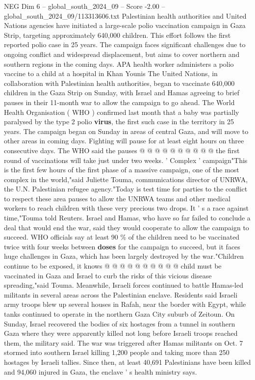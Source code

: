 \begin{textsample}{NEG Dim 6 – global\_south\_2024\_09 – Score -2.00 – global\_south\_2024\_09/113313606.txt}  \label{ex:f6_neg_008}
Palestinian health authorities and United Nations agencies have initiated a large-scale polio vaccination campaign in Gaza Strip, targeting approximately 640,000 children.
This effort follows the first reported polio case in 25 years.
The campaign faces significant challenges due to ongoing conflict and widespread displacement, but aims to cover northern and southern regions in the coming days.
APA health worker administers a polio vaccine to a child at a hospital in Khan Younis The United Nations, in collaboration with Palestinian health authorities, began to vaccinate 640,000 children in the Gaza Strip on Sunday, with Israel and Hamas agreeing to brief pauses in their 11-month war to allow the campaign to go ahead.
The World Health Organisation ( WHO ) confirmed last month that a baby was partially paralysed by the type 2 polio \textbf{virus}, the first such case in the territory in 25 years.
The campaign began on Sunday in areas of central Gaza, and will move to other areas in coming days.
Fighting will pause for at least eight hours on three consecutive days.
The WHO said the pauses @ @ @ @ @ @ @ @ @ @ the first round of vaccinations will take just under two weeks. ' Complex ' campaign"This is the first few hours of the first phase of a massive campaign, one of the most complex in the world,"said Juliette Touma, communications director of UNRWA, the U.N.
Palestinian refugee agency."Today is test time for parties to the conflict to respect these area pauses to allow the UNRWA teams and other medical workers to reach children with these very precious two drops.
It ' s a race against time,"Touma told Reuters.
Israel and Hamas, who have so far failed to conclude a deal that would end the war, said they would cooperate to allow the campaign to succeed.
WHO officials say at least 90 \% of the children need to be vaccinated twice with four weeks between \textbf{doses} for the campaign to succeed, but it faces huge challenges in Gaza, which has been largely destroyed by the war."Children continue to be exposed, it knows @ @ @ @ @ @ @ @ @ @ child must be vaccinated in Gaza and Israel to curb the risks of this vicious disease spreading,"said Touma.
Meanwhile, Israeli forces continued to battle Hamas-led militants in several areas across the Palestinian enclave.
Residents said Israeli army troops blew up several houses in Rafah, near the border with Egypt, while tanks continued to operate in the northern Gaza City suburb of Zeitoun.
On Sunday, Israel recovered the bodies of six hostages from a tunnel in southern Gaza where they were apparently killed not long before Israeli troops reached them, the military said.
The war was triggered after Hamas militants on Oct. 7 stormed into southern Israel killing 1,200 people and taking more than 250 hostages by Israeli tallies.
Since then, at least 40,691 Palestinians have been killed and 94,060 injured in Gaza, the enclave ' s health ministry says.

\end{textsample}
